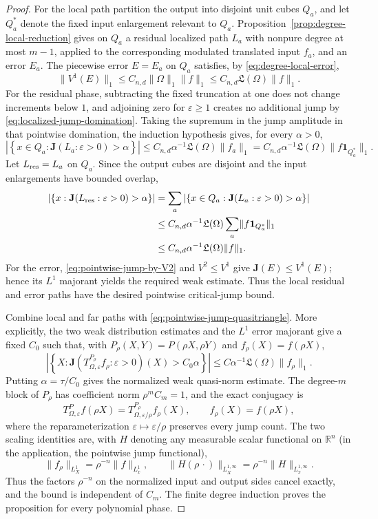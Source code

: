 \documentclass[11pt]{article}
\numberwithin{equation}{section}
\theoremstyle{remark}
\theoremstyle{definition}
\newcommand{\norm}[1]{\lVert #1\rVert}
\begin{document}
\begin{proof}
For the local path partition the output into disjoint unit cubes $Q_a$,
and let $Q_a^*$ denote the fixed input enlargement relevant to $Q_a$.
Proposition~\ref{prop:degree-local-reduction} gives on $Q_a$ a residual
localized path $L_a$ with nonpure degree at most $m-1$, applied to the
corresponding modulated translated input $f_a$, and an error $E_a$.  The
piecewise error $E=E_a$ on $Q_a$ satisfies, by
\eqref{eq:degree-local-error},
\[
 \norm{V^1(E)}_1\le C_{n,d}\norm\Omega_1\norm f_1
 \le C_{n,d}\mathfrak L(\Omega)\norm f_1.
\]
For the residual phase, subtracting the fixed truncation at one does not
change increments below $1$, and adjoining zero for $\varepsilon\ge1$
creates no additional jump by \eqref{eq:localized-jump-domination}.
Taking the supremum in the jump amplitude in that pointwise domination,
the induction hypothesis gives, for every $\alpha>0$,
\[
 \left|\left\{x\in Q_a:\mathbf J(L_a:\varepsilon>0)>\alpha\right\}\right|
 \le C_{n,d}\alpha^{-1}\mathfrak L(\Omega)
       \norm{f_a}_1
  = C_{n,d}\alpha^{-1}\mathfrak L(\Omega)
       \norm{f\mathbf1_{Q_a^*}}_1.
\]
Let $L_{\rm res}=L_a$ on $Q_a$.  Since the output cubes are disjoint and
the input enlargements have bounded overlap,
\begin{align*}
 \left|\left\{x:\mathbf J(L_{\rm res}:\varepsilon>0)>\alpha\right\}\right|
 &=\sum_a
 \left|\left\{x\in Q_a:\mathbf J(L_a:\varepsilon>0)>\alpha\right\}\right|\\
 &\le C_{n,d}\alpha^{-1}\mathfrak L(\Omega)
       \sum_a\norm{f\mathbf1_{Q_a^*}}_1\\
 &\le C_{n,d}\alpha^{-1}\mathfrak L(\Omega)\norm f_1.
\end{align*}
For the error, \eqref{eq:pointwise-jump-by-V2} and $V^2\le V^1$ give
$\mathbf J(E)\le V^1(E)$; hence its $L^1$ majorant yields the required
weak estimate.  Thus the local residual and error paths have the desired
pointwise critical-jump bound.

Combine local and far paths with
\eqref{eq:pointwise-jump-quasitriangle}.  More explicitly, the two weak
distribution estimates and the $L^1$ error majorant give a fixed $C_0$
such that, with $P_\rho(X,Y)=P(\rho X,\rho Y)$ and
$f_\rho(X)=f(\rho X)$,
\[
 \left|\left\{X:
  \mathbf J(T^{P_\rho}_{\Omega,\varepsilon}f_\rho:
            \varepsilon>0)(X)>C_0\alpha\right\}\right|
 \le C\alpha^{-1}\mathfrak L(\Omega)\|f_\rho\|_1.
\]
Putting $\alpha=\tau/C_0$ gives the normalized weak quasi-norm estimate.
The degree-$m$ block of $P_\rho$ has
coefficient norm $\rho^mC_m=1$, and the exact conjugacy is
\[
 T^P_{\Omega,\varepsilon}f(\rho X)
 =T^{P_\rho}_{\Omega,\varepsilon/\rho}f_\rho(X),
 \qquad f_\rho(X)=f(\rho X),
\]
where the reparameterization
$\varepsilon\mapsto\varepsilon/\rho$ preserves every jump count.  The
two scaling identities are, with $H$ denoting any measurable scalar
functional on $\mathbb R^n$ (in the application, the pointwise jump
functional),
\[
 \|f_\rho\|_{L^1_X}=\rho^{-n}\|f\|_{L^1_x},
 \qquad
 \|H(\rho\,\cdot)\|_{L^{1,\infty}_X}
 =\rho^{-n}\|H\|_{L^{1,\infty}_x}.
\]
Thus the factors $\rho^{-n}$ on the normalized input and output sides
cancel exactly, and the bound is independent of $C_m$.  The finite degree
induction proves the proposition for every polynomial phase.
\end{proof}
\end{document}
